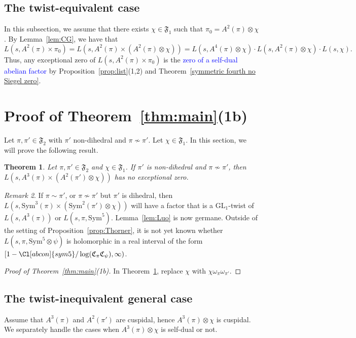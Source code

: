 \documentclass[11pt]{amsart}
\newtheorem{theorem}{Theorem}[section]
\theoremstyle{remark}
\newtheorem{remark}[theorem]{Remark}
\newcommand{\Sym}{\mathrm{Sym}}
\newcommand{\GL}{\mathrm{GL}}
\newcommand{\fF}{\mathfrak{F}}
\numberwithin{equation}{section}
\begin{document}
\subsection{The twist-equivalent case} 
In this subsection, we assume that there exists $\chi\in\fF_1$ such that $\pi_0 = A^2(\pi) \otimes \chi$.  By Lemma~\ref{lem:CG}, we have that
\[
    L(s,A^2(\pi) \times \pi_0) = L(s,A^2(\pi) \times (A^2(\pi) \otimes \chi)) = L(s,A^4(\pi) \otimes \chi) \cdot L(s,A^2(\pi) \otimes \chi) \cdot L(s,\chi).
\]
Thus, any exceptional zero of $L(s,A^2(\pi) \times \pi_0)$ is the \textcolor{blue}{zero of a self-dual abelian factor} by Proposition~\ref{prop:list}(1,2) and Theorem~\ref{symmetric fourth no Siegel zero}.


\section{Proof of Theorem~\ref{thm:main}(1b)}
\label{sec:1b}

Let $\pi,\pi' \in \fF_2$ with $\pi'$ non-dihedral and $\pi \not\sim \pi'$. Let $\chi \in \fF_1$.  In this section, we will prove the following result.

\begin{theorem}
\label{thm:GL4xGL3}
Let $\pi,\pi' \in \fF_2$ and $\chi\in\mathfrak{F}_1$.  If $\pi'$ is non-dihedral and $\pi\not\sim\pi'$, then $L(s,A^3(\pi)\times(A^2(\pi')\otimes\chi))$ has no exceptional zero.
\end{theorem}

\begin{remark}
\label{rem:GL4xGL3}
If $\pi\sim\pi'$, or $\pi\not\sim\pi'$ but $\pi'$ is dihedral, then $L(s,\mathrm{Sym}^3(\pi)\times(\Sym^2(\pi')\otimes\chi))$ will have a factor that is a $\GL_1$-twist of $L(s,A^3(\pi))$ or $L(s,\pi,\Sym^5)$.  Lemma~\ref{lem:Luo} is now germane.  Outside of the setting of Proposition~\ref{prop:Thorner}, it is not yet known whether $L(s,\pi,\Sym^5\otimes\psi)$ is holomorphic in a real interval of the form $[1-\Cl[abcon]{sym5}/\log(\mathfrak{C}_{\pi}\mathfrak{C}_{\psi}),\infty)$.
\end{remark}


\begin{proof}[Proof of Theorem~\ref{thm:main}(1b)]
In Theorem~\ref{thm:GL4xGL3}, replace $\chi$ with $\chi \omega_{\pi}\omega_{\pi'}$.
\end{proof}

\subsection{The twist-inequivalent general case}
Assume that $A^3(\pi)$ and $A^2(\pi')$ are cuspidal, hence $A^3(\pi)\otimes\chi$ is cuspidal.  We separately handle the cases when $A^3(\pi)\otimes\chi$ is self-dual or not.
\end{document}

